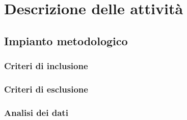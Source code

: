 \chapter{Descrizione delle attività}
\section{Impianto metodologico}
\subsection{Criteri di inclusione}
\subsection{Criteri di esclusione}
\subsection{Analisi dei dati}